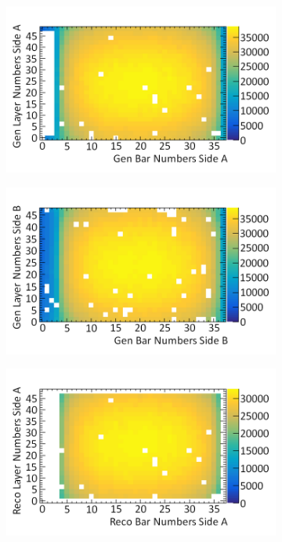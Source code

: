 \begin{figure}[!h]
\centering
\begin{subfigure}{.5\textwidth}
  \centering
  \includegraphics[width=\linewidth]{Chapter6/Figs/Raster/rawHemisphereFiducialBarsSideAMedText.png}
  \captionsetup{width=.9\linewidth}
  \caption{}
  \label{subFig:rawHemisphereFiducialBarsSideA}
\end{subfigure}%
\begin{subfigure}{.5\textwidth}
  \centering
\includegraphics[width=\linewidth]{Chapter6/Figs/Raster/rawHemisphereFiducialBarsSideBMedText.png}
  \captionsetup{width=.9\linewidth}
  \caption{}
  \label{subFig:rawHemisphereFiducialBarsSideB}
\end{subfigure}
\begin{subfigure}{.5\textwidth}
  \centering
  \includegraphics[width=\linewidth]{Chapter6/Figs/Raster/hemisphereFiducialBarsSideAMedText.png}

\end{subfigure}
\end{figure}
